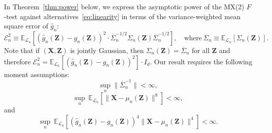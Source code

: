\documentclass[12pt]{article}
\theoremstyle{definition}
\theoremstyle{remark}
\newcommand{\prx}{\bm X}
\newcommand{\prz}{\bm Z}
\begin{document}
In Theorem~\ref{thm:power} below, we express the asymptotic power of the MX(2) $F$-test against alternatives~\eqref{eq:linearity} in terms of the variance-weighted mean square  error of $\widehat g_n$:
\begin{equation} 
	\mathcal E^2_n \equiv  \mathbb E_{\mathcal L_n}\left[(\widehat g_n(\prz)-g_n(\prz))^2 \cdot \overline \Sigma_n^{-1/2}\Sigma_n(\prz)\overline \Sigma_n^{-1/2}\right], \quad \text{where} \ \overline \Sigma_n\equiv \mathbb E_{\mathcal L_n}[\Sigma_n(\prz)].
\end{equation}
Note that if $(\prx, \prz)$ is jointly Gaussian, then $\Sigma_n(\prz) = \overline \Sigma_n$ for all $\prz$ and therefore $\mathcal E_n^2 = \mathbb E_{\mathcal L_n}[(\widehat g_n(\prz)-g_n(\prz))^2] \cdot I_d$. Our result requires the following moment assumptions:
	\begin{equation}
\sup_{n} \|\overline \Sigma_n^{-1}\| < \infty,
\label{eq:s-n-inverse-assump}
\end{equation}
\begin{equation}
	\sup_n\ \mathbb E_{\mathcal L_n}[\|\prx - \mu_n(\prz)\|^8] < \infty,
	\label{eq:eighth-moment-assump-1}
\end{equation}
and
\begin{equation}
	\sup_n\ \mathbb E_{\mathcal L_n}[(\widehat g_n(\prz)-g_n(\prz))^4\|\prx - \mu_n(\prz)\|^4] < \infty.
	\label{eq:eighth-moment-assump-2}
\end{equation}
\end{document}
